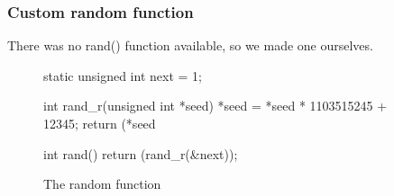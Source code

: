 \subsubsection{Custom random function}

There was no rand() function available, so we made one ourselves.

\begin{figure}[!ht]
\begin{code}

static unsigned int next = 1;

int rand_r(unsigned int *seed) {
    *seed = *seed * 1103515245 + 12345;
    return (*seed %
}

int rand() {
    return (rand_r(&next));
}

\end{code}
\caption{The random function}
\end{figure}
